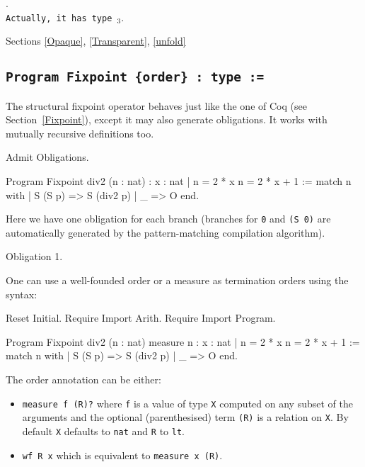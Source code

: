 \begin{ErrMsgs}
\item {}.\\
    \texttt{Actually, it has type {\term$_3$}}.
\end{ErrMsgs}

\SeeAlso Sections \ref{Opaque}, \ref{Transparent}, \ref{unfold}

\subsection{\tt Program Fixpoint {\ident} {\params} {\tt \{order\}} : type := \term
  \label{ProgramFixpoint}}

The structural fixpoint operator behaves just like the one of Coq
(see Section~\ref{Fixpoint}), except it may also generate obligations.
It works with mutually recursive definitions too.

\begin{coq_eval}
Admit Obligations.
\end{coq_eval}
\begin{coq_example}
Program Fixpoint div2 (n : nat) : { x : nat | n = 2 * x \/ n = 2 * x + 1 } :=
  match n with
  | S (S p) => S (div2 p)
  | _ => O
  end.
\end{coq_example}

Here we have one obligation for each branch (branches for \verb:0: and \verb:(S 0): are
automatically generated by the pattern-matching compilation algorithm).
\begin{coq_example}
  Obligation 1.
\end{coq_example}

One can use a well-founded order or a measure as termination orders using the syntax:
\begin{coq_eval}
Reset Initial.
Require Import Arith.
Require Import Program.
\end{coq_eval}
\begin{coq_example*}
Program Fixpoint div2 (n : nat) {measure n} :
  { x : nat | n = 2 * x \/ n = 2 * x + 1 } :=
  match n with
  | S (S p) => S (div2 p)
  | _ => O
  end.
\end{coq_example*}

The order annotation can be either:
\begin{itemize}
\item {\tt measure f (R)?} where {\tt f} is a value of type {\tt X}
  computed on any subset of the arguments and the optional
  (parenthesised) term {\tt (R)} is a relation
  on {\tt X}. By default {\tt X} defaults to {\tt nat} and {\tt R} to
  {\tt lt}.
\item {\tt wf R x} which is equivalent to {\tt measure x (R)}.
\end{itemize}

